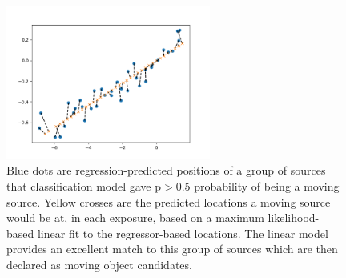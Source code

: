 \begin{figure}[ht]
    \centering
    \includegraphics[width=0.6\textwidth,keepaspectratio]{Figures/diagnostic.png}
    \caption{Blue dots are regression-predicted positions of a group of sources that classification model gave p$>$0.5 probability of being a moving source. 
    Yellow crosses are the predicted locations a moving source would be at, in each exposure, based on a maximum likelihood-based linear fit to the regressor-based locations.
    The linear model provides an excellent match to this group of sources which are then declared as moving object candidates.
    }
    \label{fig:linking}
\end{figure}



